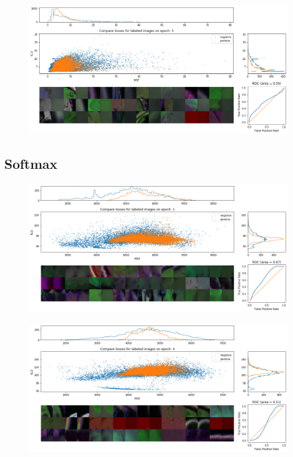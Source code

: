 \begin{figure}[h!]
    \centering
    \includegraphics[width=1.0\textwidth]{images/cvae_5}
    \caption{}
    \label{fig:cvae}
\end{figure}

\subsection{Softmax}

\begin{figure}[h!]
    \centering
    \includegraphics[width=1.0\textwidth]{images/soft_cvae}
    \caption{}
    \label{fig:soft_cvae}
\end{figure}

\begin{figure}[h!]
    \centering
    \includegraphics[width=1.0\textwidth]{images/soft_cvae_4}
    \caption{}
    \label{fig:soft_cvae_4}
\end{figure}


